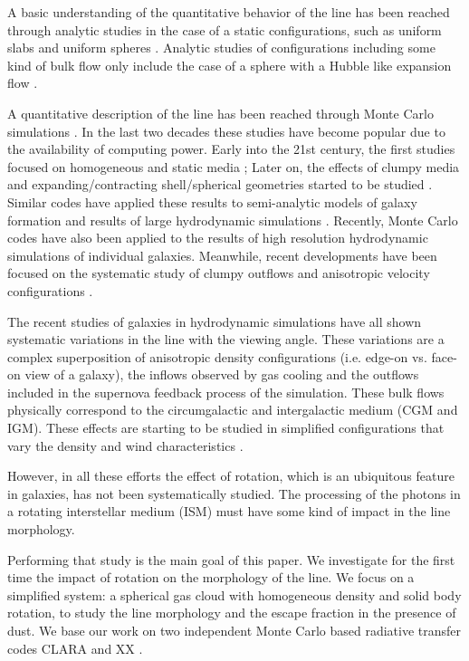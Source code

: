 \documentclass{emulateapj}
\newcommand{\ly}{{\ifmmode{{\rm Ly}\alpha~}\else{Ly$\alpha$~}\fi}}
\begin{document}
A basic understanding of the quantitative behavior of the \ly line
has been reached through analytic studies in the case of a static
configurations, such as uniform slabs
\citep{Harrington73,Neufeld90} and uniform spheres
\citep{Dijkstra06}. Analytic studies of configurations including
some kind of bulk flow only include the case of a sphere with a Hubble
like expansion flow \citep{LoebRybicki}. 

A quantitative description of the \ly line has been reached through
Monte Carlo simulations \citep{Auer68,Avery68,Adams72}. In the last
two decades these studies have become popular due to the
availability of computing power. Early into the 21st century, the first
studies focused on homogeneous and static media
\citep{Ahn00,Ahn01,Zheng02}; Later on, the effects of clumpy media
\citep{Hansen06} and expanding/contracting shell/spherical geometries started to
be studied \citep{Verhamme06,Dijkstra06}. Similar codes have applied
these results to semi-analytic models of galaxy formation \citep{Orsi12} and
results of large hydrodynamic simulations
\citep{CLARA,Forero12,Behrens13}. Recently, Monte Carlo codes have also
been applied to the results of high resolution hydrodynamic
simulations of individual
galaxies\citep{Laursen09,Barnes11,Verhamme12,Yajima12}. Meanwhile, recent
developments have been focused on the systematic study of clumpy
outflows \citep{DijkstraKramer}and anisotropic velocity configurations
\citep{Zheng2013}. 

The recent studies of galaxies in hydrodynamic simulations
\citep{Laursen09,Barnes11,Verhamme12,Yajima12} have all shown
systematic variations in the \ly line with the viewing angle. These
variations are a complex superposition of anisotropic density
configurations (i.e. edge-on vs. face-on view of a galaxy), the
inflows observed by gas cooling and the outflows included in the
supernova feedback process of the simulation. These bulk flows
physically correspond to the circumgalactic and intergalactic medium
(CGM and IGM). These effects are starting to be studied
 in simplified configurations that vary the density and wind
 characteristics \citep{Zheng2013}. 

However, in all these efforts the effect of rotation,
which is an ubiquitous feature in galaxies, has not been
systematically studied. The processing of the \ly photons in a
rotating interstellar medium (ISM) must have some kind of impact in
the \ly line morphology. 

Performing that study is the main goal of this paper. We investigate for the
first time the impact of rotation on the morphology of the \ly
line. We focus on a simplified system: a spherical gas cloud with
homogeneous density and solid body rotation, to study the line
morphology and the escape fraction in the presence of dust. We base
our work on two independent Monte Carlo based radiative transfer codes
CLARA \citep{CLARA} and XX \citep{DijkstraKramer} .   
  
\end{document}

